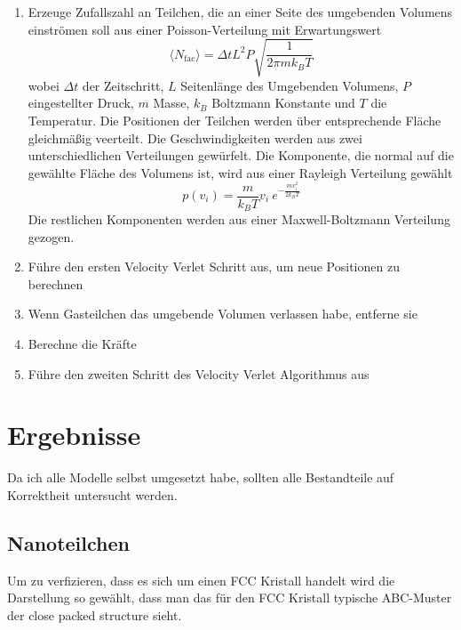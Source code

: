 \documentclass[12pt]{article}
\begin{document}
\begin{enumerate}
\item Erzeuge Zufallszahl an Teilchen, die an einer Seite des umgebenden Volumens einströmen soll aus einer Poisson-Verteilung mit 
Erwartungswert 
        \begin{equation}
            \label{eq:numberofparticles}
            \langle N_\text{fac}\rangle = \Delta t L^2 P \sqrt{\frac{1}{2\pi m k_B T}}
        \end{equation}
wobei $\Delta t$ der Zeitschritt, $L$ Seitenlänge des Umgebenden Volumens, $P$ eingestellter Druck, $m$ Masse, $k_B$ Boltzmann Konstante und 
$T$ die Temperatur.
Die Positionen der Teilchen werden über entsprechende Fläche gleichmäßig veerteilt. Die Geschwindigkeiten werden aus zwei unterschiedlichen 
Verteilungen gewürfelt. Die Komponente, die normal auf die gewählte Fläche des Volumens ist, wird aus einer Rayleigh Verteilung gewählt
        \begin{equation}
            p(v_i) = \frac{m}{k_B T}v_i \ e^{-\frac{mv_i^2}{2k_BT}}
        \end{equation}
Die restlichen Komponenten werden aus einer Maxwell-Boltzmann Verteilung gezogen.
\item Führe den ersten Velocity Verlet Schritt aus, um neue Positionen zu berechnen
\item Wenn Gasteilchen das umgebende Volumen verlassen habe, entferne sie
\item Berechne die Kräfte
\item Führe den zweiten Schritt des Velocity Verlet Algorithmus aus
\end{enumerate}














\section{Ergebnisse}
Da ich alle Modelle selbst umgesetzt habe, sollten alle Bestandteile auf Korrektheit untersucht werden.
\subsection{Nanoteilchen}
Um zu verfizieren, dass es sich um einen FCC Kristall handelt wird die Darstellung so gewählt, dass man das für den FCC Kristall typische
ABC-Muster der close packed structure sieht. 
\end{document}
